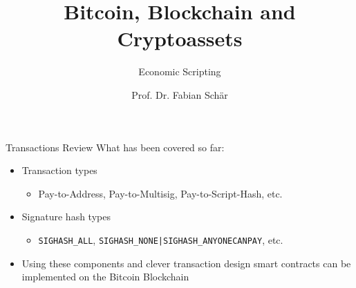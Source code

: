 \documentclass[]{beamer}
\title{Bitcoin, Blockchain and Cryptoassets}
\subtitle{Economic Scripting}
\author{Prof. Dr. Fabian Schär}
\institute{University of Basel}
\begin{document}
\thispagestyle{empty}
\begin{frame}[noframenumbering]
	\titlepage
\end{frame}


\begin{frame}{Transactions Review}
	What has been covered so far:
	\begin{itemize}
		\item<1 -> Transaction types
		\begin{itemize}
			\item<1 -> Pay-to-Address, Pay-to-Multisig, Pay-to-Script-Hash, etc.
		\end{itemize}
		\item<2 -> Signature hash types
		\begin{itemize}
			\item<2 -> \texttt{SIGHASH\_ALL}, \texttt{SIGHASH\_NONE|SIGHASH\_ANYONECANPAY}, etc.
		\end{itemize}
		\item<3 -> Using these components and clever transaction design smart contracts can be implemented on the Bitcoin Blockchain
	\end{itemize}
\end{frame}

\end{document}
